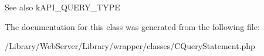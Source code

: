 \begin{DoxySeeAlso}{See also}
k\-A\-P\-I\-\_\-\-Q\-U\-E\-R\-Y\-\_\-\-T\-Y\-P\-E 
\end{DoxySeeAlso}


The documentation for this class was generated from the following file\-:\begin{DoxyCompactItemize}
\item 
/\-Library/\-Web\-Server/\-Library/wrapper/classes/C\-Query\-Statement.\-php\end{DoxyCompactItemize}
